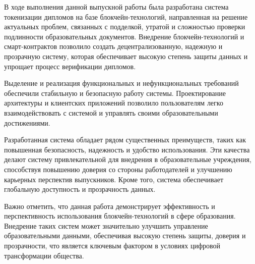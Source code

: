 \label{sec:conclusion}

В ходе выполнения данной выпускной работы была разработана система токенизации дипломов на базе блокчейн-технологий, направленная на решение актуальных проблем, связанных с подделкой, утратой и сложностью проверки подлинности образовательных документов. Внедрение блокчейн-технологий и смарт-контрактов позволило создать децентрализованную, надежную и прозрачную систему, которая обеспечивает высокую степень защиты данных и упрощает процесс верификации дипломов.

Выделение и реализация функциональных и нефункциональных требований обеспечили стабильную и безопасную работу системы. Проектирование архитектуры и клиентских приложений позволило пользователям легко взаимодействовать с системой и управлять своими образовательными достижениями.

Разработанная система обладает рядом существенных преимуществ, таких как повышенная безопасность, надежность и удобство использования. Эти качества делают систему привлекательной для внедрения в образовательные учреждения, способствуя повышению доверия со стороны работодателей и улучшению карьерных перспектив выпускников. Кроме того, система обеспечивает глобальную доступность и прозрачность данных.

Важно отметить, что данная работа демонстрирует эффективность и перспективность использования блокчейн-технологий в сфере образования. Внедрение таких систем может значительно улучшить управление образовательными данными, обеспечивая высокую степень защиты, доверия и прозрачности, что является ключевым фактором в условиях цифровой трансформации общества.